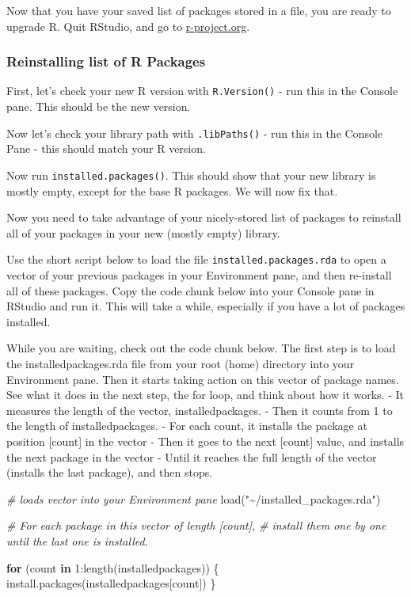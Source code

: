 \documentclass[
]{book}
\newenvironment{Shaded}{\begin{snugshade}}{\end{snugshade}}
\newcommand{\CommentTok}[1]{\textcolor[rgb]{0.56,0.35,0.01}{\textit{#1}}}
\newcommand{\ControlFlowTok}[1]{\textcolor[rgb]{0.13,0.29,0.53}{\textbf{#1}}}
\newcommand{\DecValTok}[1]{\textcolor[rgb]{0.00,0.00,0.81}{#1}}
\newcommand{\FunctionTok}[1]{\textcolor[rgb]{0.00,0.00,0.00}{#1}}
\newcommand{\NormalTok}[1]{#1}
\newcommand{\SpecialCharTok}[1]{\textcolor[rgb]{0.00,0.00,0.00}{#1}}
\newcommand{\StringTok}[1]{\textcolor[rgb]{0.31,0.60,0.02}{#1}}
\begin{document}
Now that you have your saved list of packages stored in a file, you are ready to upgrade R. Quit RStudio, and go to \href{https://www.r-project.org/}{r-project.org}.

\hypertarget{reinstalling-list-of-r-packages}{%
\subsubsection{Reinstalling list of R Packages}\label{reinstalling-list-of-r-packages}}

First, let's check your new R version with \texttt{R.Version()} - run this in the Console pane. This should be the new version.

Now let's check your library path with \texttt{.libPaths()} - run this in the Console Pane - this should match your R version.

Now run \texttt{installed.packages()}. This should show that your new library is mostly empty, except for the base R packages. We will now fix that.

Now you need to take advantage of your nicely-stored list of packages to reinstall all of your packages in your new (mostly empty) library.

Use the short script below to load the file \texttt{installed.packages.rda} to open a vector of your previous packages in your Environment pane, and then re-install all of these packages. Copy the code chunk below into your Console pane in RStudio and run it. This will take a while, especially if you have a lot of packages installed.

While you are waiting, check out the code chunk below. The first step is to load the installedpackages.rda file from your root (home) directory into your Environment pane. Then it starts taking action on this vector of package names. See what it does in the next step, the for loop, and think about how it works. - It measures the length of the vector, installedpackages. - Then it counts from 1 to the length of installedpackages. - For each count, it installs the package at position {[}count{]} in the vector - Then it goes to the next {[}count{]} value, and installs the next package in the vector - Until it reaches the full length of the vector (installs the last package), and then stops.

\begin{Shaded}
\begin{Highlighting}[]
\CommentTok{\# loads vector into your Environment pane}
\FunctionTok{load}\NormalTok{(}\StringTok{"\textasciitilde{}/installed\_packages.rda"}\NormalTok{)}

\CommentTok{\# For each package in this vector of length [count],}
\CommentTok{\# install them one by one until the last one is installed.}

\ControlFlowTok{for}\NormalTok{ (count }\ControlFlowTok{in} \DecValTok{1}\SpecialCharTok{:}\FunctionTok{length}\NormalTok{(installedpackages)) \{}
    \FunctionTok{install.packages}\NormalTok{(installedpackages[count])}
\NormalTok{\}}
\end{Highlighting}
\end{Shaded}
\end{document}
